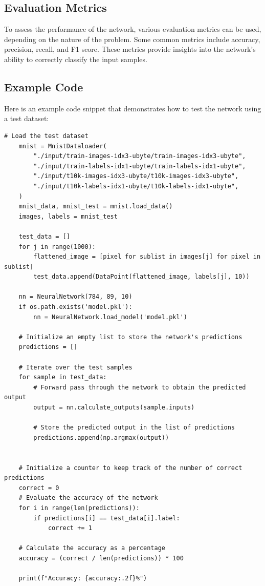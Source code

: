 \documentclass{article}
\begin{document}
\subsection{Evaluation Metrics}

To assess the performance of the network, various evaluation metrics can be used, depending on the nature of the problem. Some common metrics include accuracy, precision, recall, and F1 score. These metrics provide insights into the network's ability to correctly classify the input samples.

\subsection{Example Code}

Here is an example code snippet that demonstrates how to test the network using a test dataset:

\begin{verbatim}
# Load the test dataset
    mnist = MnistDataloader(
        "./input/train-images-idx3-ubyte/train-images-idx3-ubyte",
        "./input/train-labels-idx1-ubyte/train-labels-idx1-ubyte",
        "./input/t10k-images-idx3-ubyte/t10k-images-idx3-ubyte",
        "./input/t10k-labels-idx1-ubyte/t10k-labels-idx1-ubyte",
    )
    mnist_data, mnist_test = mnist.load_data()
    images, labels = mnist_test
    
    test_data = []
    for j in range(1000):
        flattened_image = [pixel for sublist in images[j] for pixel in sublist]
        test_data.append(DataPoint(flattened_image, labels[j], 10))
    
    nn = NeuralNetwork(784, 89, 10)
    if os.path.exists('model.pkl'):
        nn = NeuralNetwork.load_model('model.pkl')
    
    # Initialize an empty list to store the network's predictions
    predictions = []
    
    # Iterate over the test samples
    for sample in test_data:
        # Forward pass through the network to obtain the predicted output
        output = nn.calculate_outputs(sample.inputs)
        
        # Store the predicted output in the list of predictions
        predictions.append(np.argmax(output))
        
    
    # Initialize a counter to keep track of the number of correct predictions
    correct = 0
    # Evaluate the accuracy of the network
    for i in range(len(predictions)):
        if predictions[i] == test_data[i].label:
            correct += 1
    
    # Calculate the accuracy as a percentage
    accuracy = (correct / len(predictions)) * 100
    
    print(f"Accuracy: {accuracy:.2f}%")
\end{verbatim}
\end{document}
